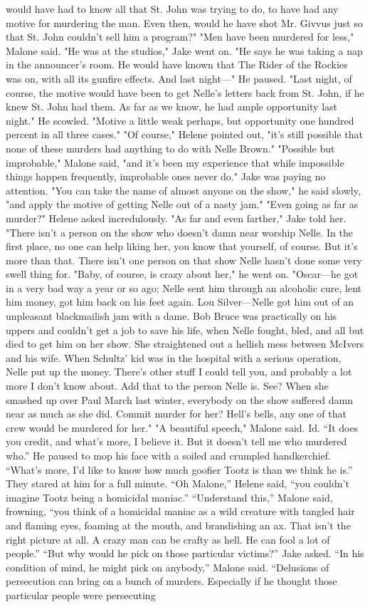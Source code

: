 \documentclass{novel}
\begin{document}
would have had to know all that St. John was trying to do, to have had any motive for murdering the man. Even then, would he have shot Mr. Givvus just so that St. John couldn't sell him a program?" "Men have been murdered for less," Malone said. "He was at the studios," Jake went on. "He says he was taking a nap in the announcer's room. He would have known that The Rider of the Rockies was on, with all its gunfire effects. And last night—" He paused. "Last night, of course, the motive would have been to get Nelle's letters back from St. John, if he knew St. John had them. As far as we know, he had ample opportunity last night." He scowled. "Motive a little weak perhaps, but opportunity one hundred percent in all three cases." "Of course," Helene pointed out, "it's still possible that none of these murders had anything to do with Nelle Brown." "Possible but improbable," Malone said, "and it's been my experience that while impossible things happen frequently, improbable ones never do." Jake was paying no attention. "You can take the name of almost anyone on the show," he said slowly, "and apply the motive of getting Nelle out of a nasty jam." "Even going as far as murder?" Helene asked incredulously. "As far and even farther," Jake told her. "There isn't a person on the show who doesn't damn near worship Nelle. In the first place, no one can help liking her, you know that yourself, of course. But it's more than that. There isn't one person on that show Nelle hasn't done some very swell thing for. "Baby, of course, is crazy about her," he went on. "Oscar—he got in a very bad way a year or so ago; Nelle sent him through an alcoholic cure, lent him money, got him back on his feet again. Lou Silver—Nelle got him out of an unpleasant blackmailish jam with a dame. Bob Bruce was practically on his uppers and couldn't get a job to save his life, when Nelle fought, bled, and all but died to get him on her show. She straightened out a hellish mess between McIvers and his wife. When Schultz' kid was in the hospital with a serious operation, Nelle put up the money. There's other stuff I could tell you, and probably a lot more I don't know about. Add that to the person Nelle is. See? When she smashed up over Paul March last winter, everybody on the show suffered damn near as much as she did. Commit murder for her? Hell's bells, any one of that crew would be murdered for her." "A beautiful speech," Malone said. Id. “It does you credit, and what’s more, I believe it. But it doesn’t tell me who murdered who.” He paused to mop his face with a soiled and crumpled handkerchief. “What’s more, I’d like to know how much goofier Tootz is than we think he is.” They stared at him for a full minute. “Oh Malone,” Helene said, “you couldn’t imagine Tootz being a homicidal maniac.” “Understand this,” Malone said, frowning, “you think of a homicidal maniac as a wild creature with tangled hair and flaming eyes, foaming at the mouth, and brandishing an ax. That isn’t the right picture at all. A crazy man can be crafty as hell. He can fool a lot of people.” “But why would he pick on those particular victims?” Jake asked. “In his condition of mind, he might pick on anybody,” Malone said. “Delusions of persecution can bring on a bunch of murders. Especially if he thought those particular people were persecuting 
\end{document}
